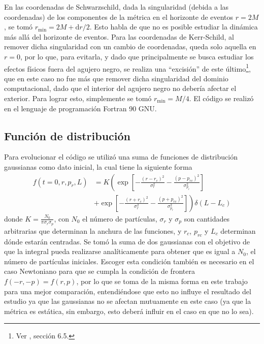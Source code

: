 \documentclass[11pt,twoside,openright,spanish]{report}
\numberwithin{equation}{chapter}
\numberwithin{figure}{chapter}
\numberwithin{table}{chapter}
\begin{document}
En las coordenadas de Schwarzschild, dada la singularidad (debida a las coordenadas) de los componentes de la métrica en el horizonte de eventos $r=2M$, se tomó $r_{\text{min}}=2M+\text{d}r/2$. Esto habla de que no es posible estudiar la dinámica más allá del horizonte de eventos. Para las coordenadas de Kerr-Schild, al remover dicha singularidad con un cambio de coordenadas, queda solo aquella en $r=0$, por lo que, para evitarla, y dado que principalmente se busca estudiar los efectos físicos fuera del agujero negro, se realiza una ``excisión'' de este último\footnote{Ver \citet{alcubierre}, sección 6.5.}, que en este caso no fue más que remover dicha singularidad del dominio computacional, dado que el interior del agujero negro no debería afectar el exterior. Para lograr esto, simplemente se tomó $r_{\text{min}}=M/4$. El código se realizó en el lenguaje de programación Fortran 90 GNU.

% 

% 

\subsection{Función de distribución}
\noindent
Para evolucionar el código se utilizó una suma de funciones de distribución gaussianas como dato inicial, la cual tiene la siguiente forma
\begin{align}
\nonumber
f(t=0,r,p_r,L)&=K\left(\exp\left[-\frac{\left(r-r_c\right)^2}{\sigma_r^2}-\frac{\left(p-p_{rc}\right)^2}{\sigma_{p_r}^2}\right]\right.\\
&\left.+\exp\left[-\frac{\left(r+r_c\right)^2}{\sigma_r^2}-\frac{\left(p+p_{rc}\right)^2}{\sigma_{p_r}^2}\right]\right)\delta(L-L_c)
\label{gaussian}
\end{align}
donde $K=\frac{N_0}{\pi\sigma_r\sigma_p}$, con $N_0$ el número de partículas, $\sigma_r$ y $\sigma_p$ son cantidades arbitrarias que determinan la anchura de las funciones, y $r_c$, $p_{rc}$ y $L_c$ determinan dónde estarán centradas. Se tomó la suma de dos gaussianas con el objetivo de que la integral pueda realizarse analíticamente para obtener que es igual a $N_0$, el número de partículas iniciales. Escoger esta condición también es necesario en el caso Newtoniano para que se cumpla la condición de frontera $f(-r,-p)=f(r,p)$, por lo que se toma de la misma forma en este trabajo para una mejor comparación, entendiéndose que esto no influye el resultado del estudio ya que las gaussianas no se afectan mutuamente en este caso (ya que la métrica es estática, sin embargo, esto deberá influir en el caso en que no lo sea).
\end{document}
